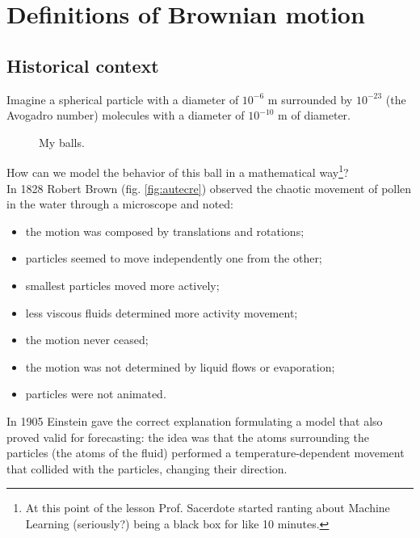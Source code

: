 \documentclass[12pt]{report}
\begin{document}
\section{Definitions of Brownian motion}
\subsection{Historical context}
Imagine a spherical particle with a diameter of $10^{-6}$ m surrounded by $10^{-23}$ (the Avogadro number) molecules with a diameter of $10^{-10}$ m of diameter.
\begin{figure}[h]
	\centering
	\caption{My balls.}
	\label{fig:screenshot006}
\end{figure}
How can we model the behavior of this ball in a mathematical way\footnote{At this point of the lesson Prof. Sacerdote started ranting about Machine Learning (seriously?) being a black box for like 10 minutes.}?\\
In 1828 Robert Brown (fig. \ref{fig:autecre}) observed the chaotic movement of pollen in the water through a microscope and noted:
\begin{itemize}
	\item the motion was composed by translations and rotations;
	\item particles seemed to move independently one from the other;
	\item smallest particles moved more actively;
	\item less viscous fluids determined more activity movement;
	\item the motion never ceased;
	\item the motion was not determined by liquid flows or evaporation;
	\item particles were not animated.
\end{itemize}
In 1905 Einstein gave the correct explanation formulating a model that also proved valid for forecasting: the idea was that the atoms surrounding the particles (the atoms of the fluid) performed a temperature-dependent movement that collided with the particles, changing their direction.\\
\end{document}
